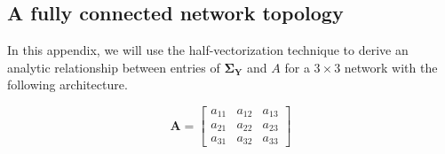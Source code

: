 \documentclass{article}
\begin{document}
\subsection*{A fully connected network topology}
In this appendix, we will use the half-vectorization technique to derive an analytic relationship between entries of $\mathbf{\Sigma_Y}$ and $A$ for a $ 3 \times 3 $ network with the following architecture.

\begin{figure}[H]
\centering

\def\figscale{1}

\begin{minipage}[c]{0.23\textwidth}
\centering

\def\a{1.2 cm}
\def\nodeSize{0.7}
\def\selfLoopR{0.5*\nodeSize cm}


\end{minipage}%
\hspace{0\textwidth}%
\begin{minipage}[c]{0.23\textwidth}
\raggedright

\[
\mathbf{A}=
\begin{bmatrix}
a_{11} & a_{12} & a_{13} \\
a_{21} & a_{22} & a_{23} \\
a_{31} & a_{32} & a_{33}
\end{bmatrix}
\]

\end{minipage}%
\hspace{0.005\textwidth}%
\begin{minipage}[c]{0.25\textwidth}
\raggedright


\end{minipage}
\end{figure}
\end{document}
